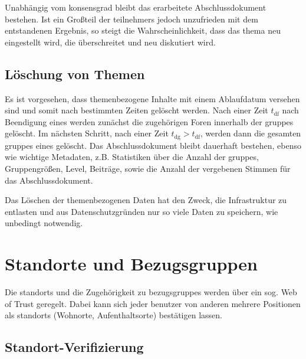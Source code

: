 \documentclass[10pt]{article}
\begin{document}
Unabhängig vom \gls{konsensgrad} bleibt das erarbeitete Abschlussdokument bestehen. Ist ein Großteil der \glspl{teilnehmer} jedoch unzufrieden mit dem entstandenen Ergebnis, so steigt die Wahrscheinlichkeit, dass das \gls{thema} neu eingestellt wird, die  überschreitet und neu diskutiert wird.


\subsection{Löschung von Themen}

Es ist vorgesehen, dass themenbezogene Inhalte mit einem Ablaufdatum versehen sind und somit nach bestimmten Zeiten gelöscht werden. Nach einer Zeit $t_\text{df}$ nach Beendigung eines  werden zunächst die zugehörigen Foren innerhalb der \glspl{gruppe} gelöscht. Im nächsten Schritt, nach einer Zeit $t_\text{dg} > t_\text{df}$, werden dann die gesamten \glspl{gruppe} eines  gelöscht. Das Abschlussdokument bleibt dauerhaft bestehen, ebenso wie wichtige Metadaten, z.B. Statistiken über die Anzahl der \glspl{gruppe}, Gruppengrößen, Level, Beiträge, sowie die Anzahl der vergebenen Stimmen für das Abschlussdokument.

Das Löschen der themenbezogenen Daten hat den Zweck, die Infrastruktur zu entlasten und aus Datenschutzgründen nur so viele Daten zu speichern, wie unbedingt notwendig.


\section{Standorte und Bezugsgruppen}

Die \glspl{standort} und die Zugehörigkeit zu \glspl{bezugsgruppe} werden über ein sog. Web of Trust geregelt. Dabei kann sich jeder \gls{benutzer} von anderen  mehrere Positionen als \glspl{standort} (Wohnorte, Aufenthaltsorte) bestätigen lassen.

\subsection{Standort-Verifizierung}
\end{document}
